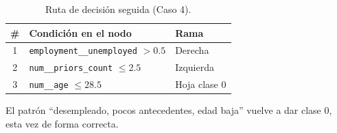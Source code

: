 \begin{table}[H]
\centering
\caption{Ruta de decisión seguida (Caso 4).}
\label{tab:local-path-caso4}
\small
\begin{tabular}{@{}cll@{}}
\toprule
\# & \textbf{Condición en el nodo} & \textbf{Rama} \\
\midrule
1 & \texttt{employment\_\_unemployed} \(> 0.5\) & Derecha \\
2 & \texttt{num\_\_priors\_count} \(\le 2.5\)   & Izquierda \\
3 & \texttt{num\_\_age} \(\le 28.5\)            & Hoja clase 0 \\
\bottomrule
\end{tabular}
\end{table}


El patrón “desempleado, pocos antecedentes, edad baja” vuelve a dar clase 0, esta vez de forma correcta.

